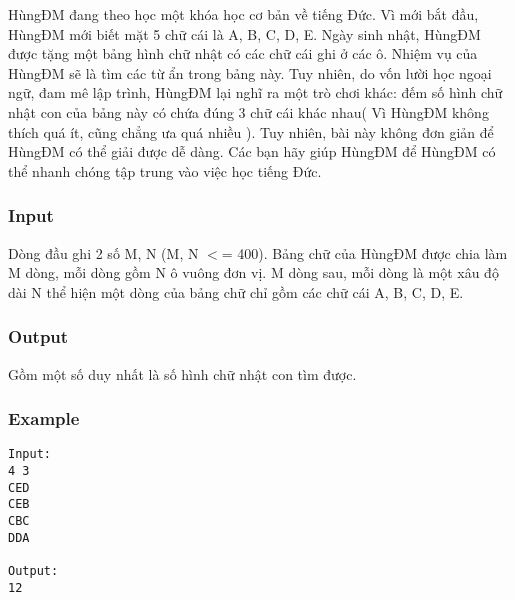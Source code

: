 



   HùngĐM đang theo học một khóa học cơ bản về tiếng Đức. Vì mới bắt đầu, HùngĐM mới biết mặt 5 chữ cái là A, B, C, D, E. Ngày sinh nhật, HùngĐM được tặng một bảng hình chữ nhật có các chữ cái ghi ở các ô. Nhiệm vụ của HùngĐM sẽ là tìm các từ ẩn trong bảng này. Tuy nhiên, do vốn lười học ngoại ngữ, đam mê lập trình, HùngĐM lại nghĩ ra một trò chơi khác: đếm số hình chữ nhật con của bảng này có chứa đúng 3 chữ cái khác nhau( Vì HùngĐM không thích quá ít, cũng chẳng ưa quá nhiều ). Tuy nhiên, bài này không đơn giản để HùngĐM có thể giải được dễ dàng. Các bạn hãy giúp HùngĐM để HùngĐM có thể nhanh chóng tập trung vào việc học tiếng Đức.  

\subsubsection{   Input  }

   Dòng đầu ghi 2 số M, N (M, N $<$= 400). Bảng chữ của HùngĐM được chia làm M dòng, mỗi dòng gồm N ô vuông đơn vị. M dòng sau, mỗi dòng là một xâu độ dài N thể hiện một dòng của bảng chữ chỉ gồm các chữ cái A, B, C, D, E.  

\subsubsection{   Output  }

   Gồm một số duy nhất là số hình chữ nhật con tìm được.  

\subsubsection{   Example  }
\begin{verbatim}
Input:
4 3
CED
CEB
CBC
DDA

Output:
12
\end{verbatim}